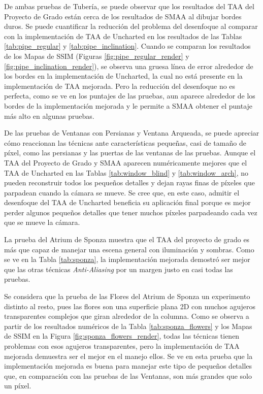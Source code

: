 \documentclass[pregrado]{tesis-usb} %
\begin{document}
De ambas pruebas de Tubería, se puede observar que los resultados del TAA del Proyecto de Grado están cerca de los resultados de SMAA al dibujar bordes duros. Se puede cuantificar la reducción del problema del desenfoque al comparar con la implementación de TAA de Uncharted en los resultados de las Tablas \ref{tab:pipe_regular} y \ref{tab:pipe_inclination}. Cuando se comparan los resultados de los Mapas de SSIM (Figuras \ref{fig:pipe_regular_render} y \ref{fig:pipe_inclination_render}), se observa una gruesa línea de error alrededor de los bordes en la implementación de Uncharted, la cual no está presente en la implementación de TAA mejorada. Pero la reducción del desenfoque no es perfecta, como se ve en los puntajes de las pruebas, aun aparece alrededor de los bordes de la implementación mejorada y le permite a SMAA obtener el puntaje más alto en algunas pruebas.

De las pruebas de Ventanas con Persianas y Ventana Arqueada, se puede apreciar cómo reaccionan las técnicas ante características pequeñas, casi de tamaño de píxel, como las persianas y las puertas de las ventanas de las pruebas. Aunque el TAA del Proyecto de Grado y SMAA aparecen numéricamente mejores que el TAA de Uncharted en las Tablas \ref{tab:window_blind} y \ref{tab:window_arch}, no pueden reconstruir todos los pequeños detalles y dejan rayas finas de píxeles que parpadean cuando la cámara se mueve. Se cree que, en este caso, admitir el desenfoque del TAA de Uncharted beneficia su aplicación final porque es mejor perder algunos pequeños detalles que tener muchos píxeles parpadeando cada vez que se mueve la cámara.

La prueba del Atrium de Sponza muestra que el TAA del proyecto de grado es más que capaz de manejar una escena general con iluminación y sombras. Como se ve en la Tabla \ref{tab:sponza}, la  implementación mejorada demostró ser mejor que las otras técnicas \textit{Anti-Aliasing} por un margen justo en casi todas las pruebas.

Se considera que la prueba de las Flores del Atrium de Sponza un experimento distinto al resto, pues las flores son una superficie plana 2D con muchos agujeros transparentes complejos que giran alrededor de la columna. Como se observa a partir de los resultados numéricos de la Tabla \ref{tab:sponza_flowers} y los Mapas de SSIM en la Figura \ref{fig:sponza_flowers_render}, todas las técnicas tienen problemas con esos agujeros transparentes, pero la implementación de TAA mejorada demuestra ser el mejor en el manejo ellos. Se ve en esta prueba que la implementación mejorada es buena para manejar este tipo de pequeños detalles que, en comparación con las pruebas de las Ventanas, son más grandes que solo un píxel. 
\end{document}
